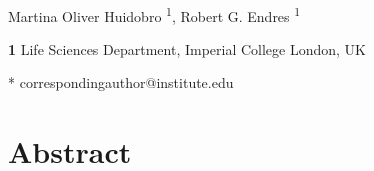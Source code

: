 \documentclass[10pt,letterpaper]{article}
\begin{document}
\vspace*{0.2in}

\begin{flushleft}
{\Large
\textbf{} %
}
\newline
\\
Martina Oliver Huidobro \textsuperscript{1},
Robert G. Endres \textsuperscript{1}


\bigskip
\textbf{1} Life Sciences Department, Imperial College London, UK
\\
\bigskip

% 
%





* correspondingauthor@institute.edu

\end{flushleft}
\section*{Abstract}
\end{document}
